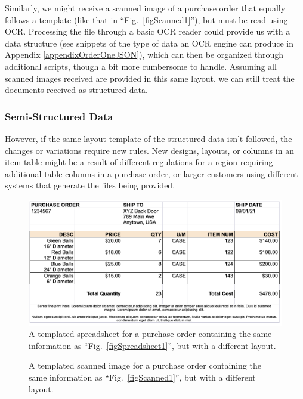 \documentclass[conference, draftcls]{IEEEtran}
\begin{document}
Similarly, we might receive a scanned image of a purchase order that equally follows a template (like that in ``Fig.~\ref{figScanned1}''), but must be read using OCR. Processing the file through a basic OCR reader could provide us with a data structure (see snippets of the type of data an OCR engine can produce in Appendix \ref{appendixOrderOneJSON}), which can then be organized through additional scripts, though a bit more cumbersome to handle. Assuming all scanned images received are provided in this same layout, we can still treat the documents received as structured data.

\subsubsection{Semi-Structured Data}
However, if the same layout template of the structured data isn't followed, the changes or variations require new rules. New designs, layouts, or columns in an item table might be a result of different regulations for a region requiring additional table columns in a purchase order, or larger customers using different systems that generate the files being provided.

\begin{figure}[ht]
\centerline{\includegraphics[width=\columnwidth]{Spreadsheet2.png}}
\caption{A templated spreadsheet for a purchase order containing the same information as ``Fig.~\ref{figSpreadsheet1}'', but with a different layout.}
\label{figSpreadsheet2}
\end{figure}

\begin{figure}[ht]
    \centerline{
}
\caption{A templated scanned image for a purchase order containing the same information as ``Fig.~\ref{figScanned1}'', but with a different layout.}
\label{figScanned2}
\end{figure}
\end{document}

